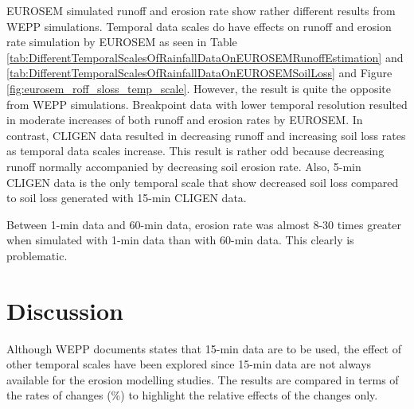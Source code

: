 EUROSEM simulated runoff and erosion rate show rather different results from
WEPP simulations. Temporal data scales do have effects on runoff and erosion
rate simulation by EUROSEM as seen in Table
\ref{tab:DifferentTemporalScalesOfRainfallDataOnEUROSEMRunoffEstimation} and
\ref{tab:DifferentTemporalScalesOfRainfallDataOnEUROSEMSoilLoss} and Figure
\ref{fig:eurosem_roff_sloss_temp_scale}. However, the result is quite the
opposite from WEPP simulations. Breakpoint data with lower temporal resolution
resulted in moderate increases of both runoff and erosion rates by EUROSEM. In
contrast, CLIGEN data resulted in decreasing runoff and increasing soil loss
rates as temporal data scales increase. This result is rather odd because
decreasing runoff normally accompanied by decreasing soil erosion rate. Also,
5-min CLIGEN data is the only temporal scale that show decreased soil loss
compared to soil loss generated with 15-min CLIGEN data.


Between 1-min data and 60-min data, erosion rate was almost 8-30 times greater
when simulated with 1-min data than with 60-min data. This clearly is
problematic.

\section{Discussion}
\label{sec:TemporalScalesDiscussion}


Although WEPP documents states that 15-min data are to be used, the effect of
other temporal scales have been explored since 15-min data are not always
available for the erosion modelling studies. The results are compared in terms
of the rates of changes (\%) to highlight the relative effects of the changes
only.

